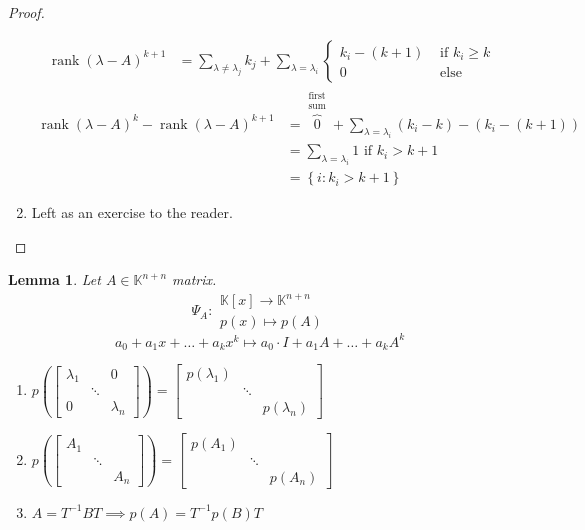 \documentclass{article}
\newtheorem{lemma}{Lemma}  \numberwithin{lemma}{section}
\newcommand{\set}[1]{\left\{#1\right\}}
\DeclareMathOperator{\rank}{rank}
\begin{document}
\begin{proof}
\begin{enumerate}
\begin{align*}
        \rank(\lambda - A)^{k+1} &= \sum_{\lambda \neq \lambda_j} k_j + \sum_{\lambda = \lambda_i} \begin{cases} k_i - (k+1) & \text{ if } k_i \geq k \\ 0 & \text{ else} \end{cases}
      \end{align*}
      \begin{align*}
        \rank(\lambda - A)^k - \rank(\lambda - A)^{k+1}
          &= \overbrace{0}^{\substack{\text{first} \\ \text{sum}}} + \sum_{\lambda = \lambda_i} (k_i - k) - (k_i - (k+1)) \\
          &= \sum_{\lambda = \lambda_i} 1 \text{ if } k_i > k+1 \\
          &= \set{i: k_i > k + 1}
      \end{align*}
    \item Left as an exercise to the reader.
  \end{enumerate}
\end{proof}

\begin{lemma} %
  Let $A \in \mathbb K^{n + n}$ matrix.
  \[ \Psi_A: \substack{\mathbb K[x] \to \mathbb K^{n + n} \\ p(x) \mapsto p(A)} \]
  \[ a_0 + a_1 x + \dots + a_k x^k \mapsto a_0 \cdot I + a_1 A + \dots + a_k A^k \]
  \begin{enumerate}
    \item $p\left(\begin{bmatrix} \lambda_1 & & 0 \\ & \ddots & \\ 0 & & \lambda_n \end{bmatrix}\right)
      = \begin{bmatrix} p(\lambda_1) & & \\ & \ddots & \\ & & p(\lambda_n) \end{bmatrix}$
    \item $p\left(\begin{bmatrix} A_1 & & \\ & \ddots & \\ & & A_n \end{bmatrix}\right) = \begin{bmatrix} p(A_1) & & \\ & \ddots & \\ & & p(A_n) \end{bmatrix}$
    \item $A = T^{-1} BT \implies p(A) = T^{-1} p(B) T$
  \end{enumerate}
\end{lemma}
\end{document}
